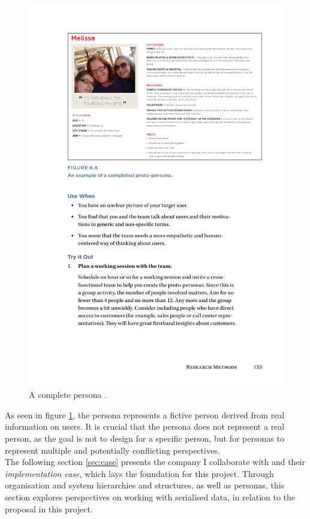\documentclass[../report.tex]{subfiles}
\begin{document}
\begin{figure}[H]
\centering
\includegraphics[width=0.9\linewidth]{figures/persona.pdf}
\caption{A complete persona \cite[p. 133]{buley2013user}.}
\label{fig:persona}
\end{figure}

As seen in figure \ref{fig:persona}, the persona represents a fictive person derived from real information on users. It is crucial that the persona does not represent a real person, as the goal is not to design for a specific person, but for personas to represent multiple and potentially conflicting perspectives. \\

The following section \ref{sec:case} presents the company I collaborate with and their \textit{implementation case}, which lays the foundation for this project. Through organisation and system hierarchies and structures, as well as personas, this section explores perspectives on working with serialised data, in relation to the proposal in this project.
\end{document}
